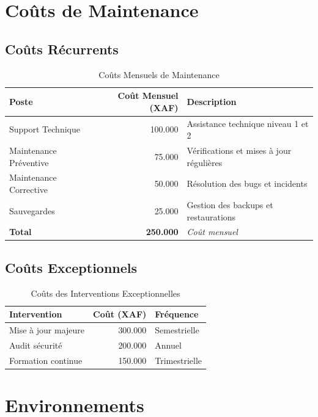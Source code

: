\documentclass[14pt,a4paper]{report}
\begin{document}
\chapter{Coûts de Maintenance}

\section{Coûts Récurrents}
\begin{table}[h]
    \centering
    \begin{tabular}{|l|r|p{6cm}|}
        \hline
        \textbf{Poste} & \textbf{Coût Mensuel (XAF)} & \textbf{Description} \\
        \hline
        Support Technique & 100.000 & Assistance technique niveau 1 et 2 \\
        \hline
        Maintenance Préventive & 75.000 & Vérifications et mises à jour régulières \\
        \hline
        Maintenance Corrective & 50.000 & Résolution des bugs et incidents \\
        \hline
        Sauvegardes & 25.000 & Gestion des backups et restaurations \\
        \hline
        \textbf{Total} & \textbf{250.000} & \textit{Coût mensuel} \\
        \hline
    \end{tabular}
    \caption{Coûts Mensuels de Maintenance}
\end{table}

\section{Coûts Exceptionnels}
\begin{table}[h]
    \centering
    \begin{tabular}{|l|r|p{6cm}|}
        \hline
        \textbf{Intervention} & \textbf{Coût (XAF)} & \textbf{Fréquence} \\
        \hline
        Mise à jour majeure & 300.000 & Semestrielle \\
        \hline
        Audit sécurité & 200.000 & Annuel \\
        \hline
        Formation continue & 150.000 & Trimestrielle \\
        \hline
    \end{tabular}
    \caption{Coûts des Interventions Exceptionnelles}
\end{table}

\chapter{Environnements}
\end{document}
